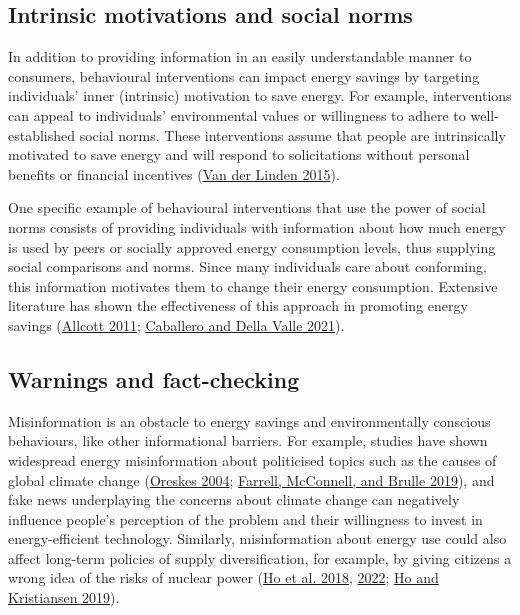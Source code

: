 \documentclass[
  11pt,
]{article}
\begin{document}
\hypertarget{intrinsic-motivations-and-social-norms}{%
\subsection{Intrinsic motivations and social
norms}\label{intrinsic-motivations-and-social-norms}}

In addition to providing information in an easily understandable manner
to consumers, behavioural interventions can impact energy savings by
targeting individuals' inner (intrinsic) motivation to save energy. For
example, interventions can appeal to individuals' environmental values
or willingness to adhere to well-established social norms. These
interventions assume that people are intrinsically motivated to save
energy and will respond to solicitations without personal benefits or
financial incentives (\protect\hyperlink{ref-van2015social}{Van der
Linden 2015}).

One specific example of behavioural interventions that use the power of
social norms consists of providing individuals with information about
how much energy is used by peers or socially approved energy consumption
levels, thus supplying social comparisons and norms. Since many
individuals care about conforming, this information motivates them to
change their energy consumption. Extensive literature has shown the
effectiveness of this approach in promoting energy savings
(\protect\hyperlink{ref-allcott2011social}{Allcott 2011};
\protect\hyperlink{ref-caballero2021tackling}{Caballero and Della Valle
2021}).

\hypertarget{warnings-and-fact-checking}{%
\subsection{Warnings and
fact-checking}\label{warnings-and-fact-checking}}

Misinformation is an obstacle to energy savings and environmentally
conscious behaviours, like other informational barriers. For example,
studies have shown widespread energy misinformation about politicised
topics such as the causes of global climate change
(\protect\hyperlink{ref-oreskes2004scientific}{Oreskes 2004};
\protect\hyperlink{ref-farrell2019evidence}{Farrell, McConnell, and
Brulle 2019}), and fake news underplaying the concerns about climate
change can negatively influence people's perception of the problem and
their willingness to invest in energy-efficient technology. Similarly,
misinformation about energy use could also affect long-term policies of
supply diversification, for example, by giving citizens a wrong idea of
the risks of nuclear power (\protect\hyperlink{ref-ho2018can}{Ho et al.
2018}, \protect\hyperlink{ref-ho2022fake}{2022};
\protect\hyperlink{ref-ho2019environmental}{Ho and Kristiansen 2019}).
\end{document}
